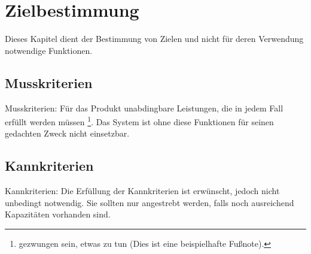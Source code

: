 \documentclass[a4paper]{scrreprt}
\begin{document}
    \begin{abstract}
        Dies ist ein beispielhaftes Pflichtenheft in \LaTeX. Das Pflichtenheft
        beschreibt in konkreter Form, wie der Auftragnehmer die Anforderungen des
        Auftraggebers zu lösen gedenkt - das sogenannte wie und womit. Der Auftraggeber
        beschreibt vorher im Lastenheft möglichst präzise die Gesamtheit der
        Forderungen - was er entwickelt oder produziert haben möchte. Erst wenn der
        Auftraggeber das Pflichtenheft akzeptiert, sollte die eigentliche Arbeit beim
        Auftragnehmer beginnen.
        \vspace{1cm}
 
        Quelle: \url{http://de.wikipedia.org/wiki/Pflichtenheft} und Lehrbuch der
        Objektmodellierung von Heide Balzert
        \vspace{0.5cm}
 
        Quellcode: \url{http://www.karllorey.de/informatik-studium/vorlesungen/softwarepraktikum/pflichtenheft-in-latex/}
    \end{abstract}
 
    \tableofcontents
 
    \chapter{Zielbestimmung}
    Dieses Kapitel dient der Bestimmung von Zielen und nicht für deren Verwendung
    notwendige Funktionen.
 
        \section{Musskriterien}
            Musskriterien: Für das Produkt unabdingbare Leistungen, die in jedem Fall
            erfüllt werden müssen \footnote{gezwungen sein, etwas zu tun (Dies ist eine
            beispielhafte Fußnote).}. Das System ist ohne diese Funktionen für seinen
            gedachten Zweck nicht einsetzbar.
 
        \section{Kannkriterien}
            Kannkriterien: Die Erfüllung der Kannkriterien ist erwünscht, jedoch nicht
            unbedingt notwendig. Sie sollten nur angestrebt werden, falls noch ausreichend
            Kapazitäten vorhanden sind.
 
\end{document}
